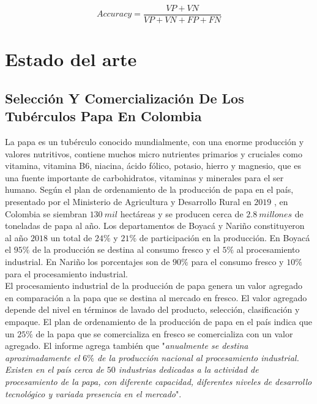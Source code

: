 \begin{equation}
	Accuracy=\frac{VP+VN}{VP+VN+FP+FN}
	\label{eq:Exactitud}
\end{equation}

\chapter{Estado del arte}

\section{Selección Y Comercialización De Los Tubérculos Papa En Colombia}

La papa es un tubérculo conocido mundialmente, con una enorme producción y valores nutritivos, contiene muchos micro nutrientes primarios y cruciales como vitamina, vitamina B6, niacina, ácido fólico, potasio, hierro y magnesio, que es una fuente importante de carbohidratos, vitaminas y minerales para el ser humano. Según el plan de ordenamiento de la producción de papa en el país, presentado por el Ministerio de Agricultura y Desarrollo Rural en $2019$ \cite{informepapa2019}, en Colombia se siembran  $130 \ mil$ hectáreas y se producen cerca de  $2.8 \ millones$  de  toneladas  de  papa  al año. Los departamentos de Boyacá y Nariño constituyeron al año $2018$ un total de $24\%$ y $21\%$ de participación en la producción. En Boyacá el $95\%$ de la producción se destina al consumo fresco y el $5\%$ al procesamiento industrial. En Nariño los porcentajes son de $90\%$ para el consumo fresco y $10\%$ para el procesamiento industrial.\\

El procesamiento industrial de la producción de papa genera un valor agregado en comparación a la papa que se destina al mercado en fresco. El valor agregado depende del nivel en términos de lavado del producto, selección, clasificación y empaque. El plan de ordenamiento de la producción de papa en el país indica que un $25\%$ de la papa que se comercializa en fresco se comercializa con un valor agregado. El informe agrega también que "\textit{anualmente se  destina  aproximadamente  el  $6\%$  de  la  producción  nacional  al procesamiento industrial.  Existen en el país cerca de $50$ industrias dedicadas a la actividad de procesamiento de la papa, con diferente capacidad, diferentes niveles de desarrollo tecnológico y variada presencia en el mercado}".\\

